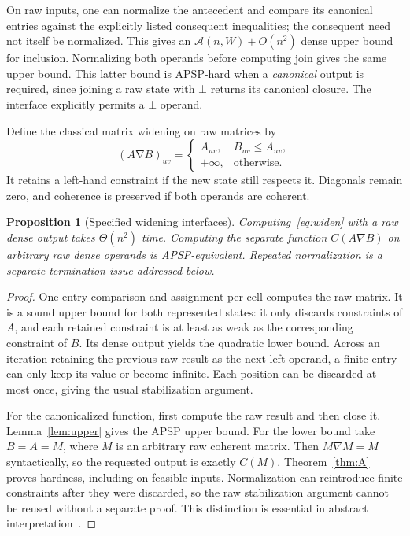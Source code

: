 \documentclass[manuscript,11pt,screen,nonacm]{acmart}
\newtheorem{proposition}[theorem]{Proposition}
\theoremstyle{definition}
\newcommand{\Atime}{\mathcal A(n,W)}
\begin{document}
On raw inputs, one can normalize the antecedent and compare its canonical entries against the explicitly listed consequent inequalities; the consequent need not itself be normalized. This gives an $\Atime+O(n^2)$ dense upper bound for inclusion. Normalizing both operands before computing join gives the same upper bound. This latter bound is APSP-hard when a \emph{canonical} output is required, since joining a raw state with $\bot$ returns its canonical closure. The interface explicitly permits a $\bot$ operand.

Define the classical matrix widening on raw matrices by
\begin{equation}\label{eq:widen}
 (A\mathbin\nabla B)_{uv}=\begin{cases}
 A_{uv},&B_{uv}\leq A_{uv},\\
 +\infty,&\text{otherwise}.
 \end{cases}
\end{equation}
It retains a left-hand constraint if the new state still respects it. Diagonals remain zero, and coherence is preserved if both operands are coherent.

\begin{proposition}[Specified widening interfaces]\label{prop:widen}
Computing~\eqref{eq:widen} with a raw dense output takes $\Theta(n^2)$ time. Computing the separate function $C(A\nabla B)$ on arbitrary raw dense operands is APSP-equivalent. Repeated normalization is a separate termination issue addressed below.
\end{proposition}
\begin{proof}
One entry comparison and assignment per cell computes the raw matrix. It is a sound upper bound for both represented states: it only discards constraints of $A$, and each retained constraint is at least as weak as the corresponding constraint of $B$. Its dense output yields the quadratic lower bound. Across an iteration retaining the previous raw result as the next left operand, a finite entry can only keep its value or become infinite. Each position can be discarded at most once, giving the usual stabilization argument.

For the canonicalized function, first compute the raw result and then close it. Lemma~\ref{lem:upper} gives the APSP upper bound. For the lower bound take $B=A=M$, where $M$ is an arbitrary raw coherent matrix. Then $M\nabla M=M$ syntactically, so the requested output is exactly $C(M)$. Theorem~\ref{thm:A} proves hardness, including on feasible inputs. Normalization can reintroduce finite constraints after they were discarded, so the raw stabilization argument cannot be reused without a separate proof. This distinction is essential in abstract interpretation~\cite{mine2006,bhz2009,gange2021}.
\end{proof}
\end{document}
